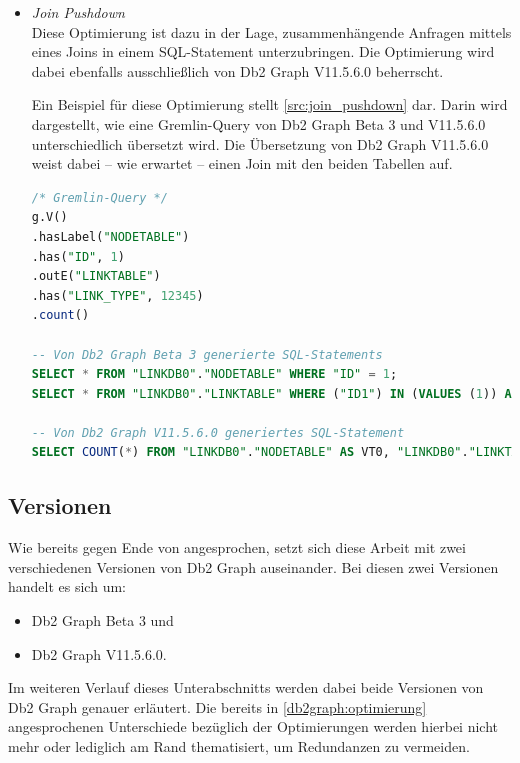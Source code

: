 \begin{itemize}
    \item \textit{Join Pushdown}\\
    Diese Optimierung ist dazu in der Lage, zusammenhängende Anfragen mittels eines Joins in einem SQL-Statement unterzubringen. Die Optimierung wird dabei ebenfalls ausschließlich von Db2 Graph V11.5.6.0 beherrscht.

    Ein Beispiel für diese Optimierung stellt \autoref{src:join_pushdown} dar. Darin wird dargestellt, wie eine Gremlin-Query von Db2 Graph Beta 3 und V11.5.6.0 unterschiedlich übersetzt wird. Die Übersetzung von Db2 Graph V11.5.6.0 weist dabei -- wie erwartet -- einen Join mit den beiden Tabellen auf.

\begin{lstlisting}[label=src:join_pushdown,caption={Beispiel Join Pushdown},language=SQL]
/* Gremlin-Query */
g.V()
.hasLabel("NODETABLE")
.has("ID", 1)
.outE("LINKTABLE")
.has("LINK_TYPE", 12345)
.count()

-- Von Db2 Graph Beta 3 generierte SQL-Statements
SELECT * FROM "LINKDB0"."NODETABLE" WHERE "ID" = 1;
SELECT * FROM "LINKDB0"."LINKTABLE" WHERE ("ID1") IN (VALUES (1)) AND "LINK_TYPE" = 12345;

-- Von Db2 Graph V11.5.6.0 generiertes SQL-Statement
SELECT COUNT(*) FROM "LINKDB0"."NODETABLE" AS VT0, "LINKDB0"."LINKTABLE" AS ET1 WHERE VT0."ID" = 1 AND ET1."LINK_TYPE" = 12345 AND VT0.ID = ET1.ID1
\end{lstlisting}
\end{itemize}

\subsection{Versionen}
\label{db2graph:versionen}

Wie bereits gegen Ende von  angesprochen, setzt sich diese Arbeit mit zwei verschiedenen Versionen von Db2 Graph auseinander. Bei diesen zwei Versionen handelt es sich um: 

\begin{itemize}
    \item Db2 Graph Beta 3 und
    \item Db2 Graph V11.5.6.0.
\end{itemize}

Im weiteren Verlauf dieses Unterabschnitts werden dabei beide Versionen von Db2 Graph genauer erläutert. Die bereits in \autoref{db2graph:optimierung} angesprochenen Unterschiede bezüglich der Optimierungen werden hierbei nicht mehr oder lediglich am Rand thematisiert, um Redundanzen zu vermeiden. 

